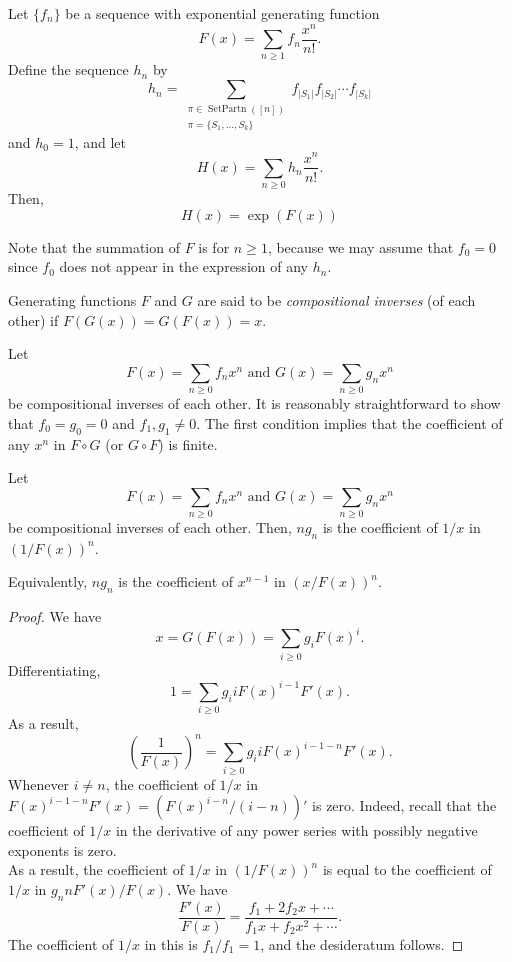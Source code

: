 	\begin{ftheo}
		\label{ec2: egf sum over partitions}
		Let $\{f_n\}$ be a sequence with exponential generating function
		\[ F(x) = \sum_{n \ge 1} f_n \frac{x^n}{n!}. \]
		Define the sequence $h_n$ by
		\[ h_n = \sum_{\substack{\pi \in \operatorname{SetPartn}([n]) \\ \pi = \{S_1,\ldots,S_k\}}} f_{|S_1|} f_{|S_2|} \cdots f_{|S_k|}  \]
		and $h_0 = 1$, and let
		\[ H(x) = \sum_{n \ge 0} h_n \frac{x^n}{n!}. \]
		Then,
		\[ H(x) = \exp(F(x)) \]
	\end{ftheo}
	Note that the summation of $F$ is for $n \ge 1$, because we may assume that $f_0 = 0$ since $f_0$ does not appear in the expression of any $h_n$.\\

	\begin{fdef}
		Generating functions $F$ and $G$ are said to be \emph{compositional inverses} (of each other) if $F(G(x)) = G(F(x)) = x$.
	\end{fdef}

	Let
	\[ F(x) = \sum_{n \ge 0} f_n x^n \text{ and } G(x) = \sum_{n \ge 0} g_n x^n \]
	be compositional inverses of each other. It is reasonably straightforward to show that $f_0 = g_0 = 0$ and $f_1,g_1 \ne 0$. The first condition implies that the coefficient of any $x^n$ in $F\circ G$ (or $G \circ F$) is finite. 

	\begin{ftheo}
		\label{theo: lagrange inversion}
		Let
		\[ F(x) = \sum_{n \ge 0} f_n x^n \text{ and } G(x) = \sum_{n \ge 0} g_n x^n \]
		be compositional inverses of each other. Then, $ng_n$ is the coefficient of $1/x$ in $(1/F(x))^n$.
	\end{ftheo}
	Equivalently, $ng_n$ is the coefficient of $x^{n-1}$ in $(x/F(x))^n$.
	\begin{proof}
		We have
		\[ x = G(F(x)) = \sum_{i \ge 0} g_i F(x)^i. \]
		Differentiating,
		\[ 1 = \sum_{i \ge 0} g_i i F(x)^{i-1} F'(x). \]
		As a result,
		\[ \left(\frac{1}{F(x)}\right)^n = \sum_{i \ge 0} g_i i F(x)^{i-1-n} F'(x).  \]
		Whenever $i \ne n$, the coefficient of $1/x$ in $F(x)^{i-1-n} F'(x) = \left(F(x)^{i-n}/(i-n)\right)'$ is zero. Indeed, recall that the coefficient of $1/x$ in the derivative of any power series with possibly negative exponents is zero.\\
		As a result, the coefficient of $1/x$ in $(1/F(x))^n$ is equal to the coefficient of $1/x$ in $g_n n F'(x) / F(x)$.
		We have
		\[ \frac{F'(x)}{F(x)} = \frac{f_1 + 2f_2x + \cdots}{f_1x + f_2x^2 + \cdots}. \]
		The coefficient of $1/x$ in this is $f_1/f_1 = 1$, and the desideratum follows. 
	\end{proof}

